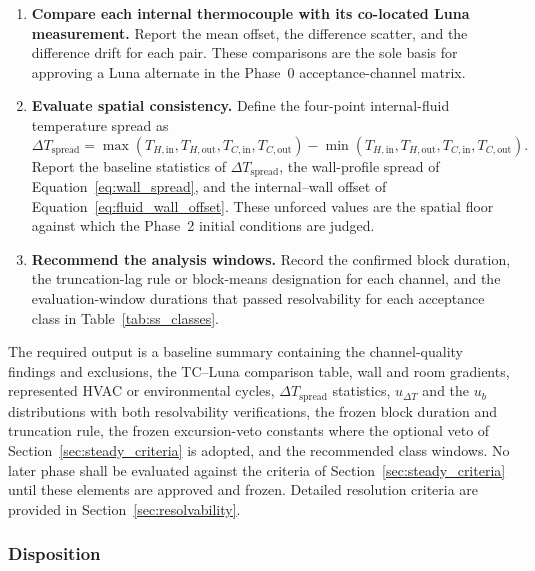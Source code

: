 \documentclass[11pt]{article}
\begin{document}
\begin{enumerate}
    \item \textbf{Compare each internal thermocouple with its co-located Luna measurement.} Report the mean offset, the difference scatter, and the difference drift for each pair. These comparisons are the sole basis for approving a Luna alternate in the Phase~0 acceptance-channel matrix.

    \item \textbf{Evaluate spatial consistency.} Define the four-point internal-fluid temperature spread as
    \begin{equation}
        \Delta T_{\mathrm{spread}}
        =
        \max\left(
            T_{H,\mathrm{in}},
            T_{H,\mathrm{out}},
            T_{C,\mathrm{in}},
            T_{C,\mathrm{out}}
        \right)
        -
        \min\left(
            T_{H,\mathrm{in}},
            T_{H,\mathrm{out}},
            T_{C,\mathrm{in}},
            T_{C,\mathrm{out}}
        \right).
        \label{eq:four_point_spread}
    \end{equation}
    Report the baseline statistics of $\Delta T_{\mathrm{spread}}$, the wall-profile spread of Equation~\eqref{eq:wall_spread}, and the internal--wall offset of Equation~\eqref{eq:fluid_wall_offset}. These unforced values are the spatial floor against which the Phase~2 initial conditions are judged.

    \item \textbf{Recommend the analysis windows.} Record the confirmed block duration, the truncation-lag rule or block-means designation for each channel, and the evaluation-window durations that passed resolvability for each acceptance class in Table~\ref{tab:ss_classes}.
\end{enumerate}

The required output is a baseline summary containing the channel-quality findings and exclusions, the TC--Luna comparison table, wall and room gradients, represented HVAC or environmental cycles, $\Delta T_{\mathrm{spread}}$ statistics, $u_{\Delta T}$ and the $u_b$ distributions with both resolvability verifications, the frozen block duration and truncation rule, the frozen excursion-veto constants where the optional veto of Section~\ref{sec:steady_criteria} is adopted, and the recommended class windows. No later phase shall be evaluated against the criteria of Section~\ref{sec:steady_criteria} until these elements are approved and frozen. Detailed resolution criteria are provided in Section~\ref{sec:resolvability}.


\subsubsection{Disposition}
\end{document}
